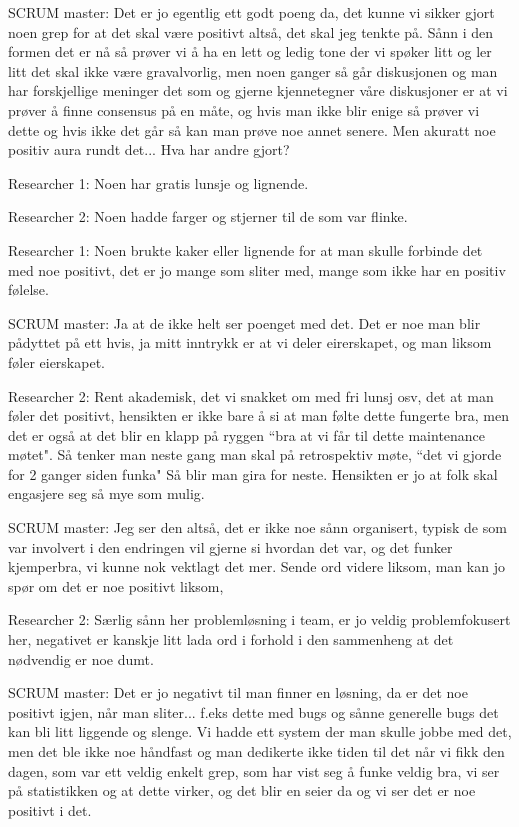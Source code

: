 SCRUM master: Det er jo egentlig ett godt poeng da, det kunne vi sikker gjort noen grep for at det skal være positivt altså, det skal jeg tenkte på. Sånn i den formen det er nå så prøver vi å ha en lett og ledig tone der vi spøker litt og ler litt det skal ikke være gravalvorlig, men noen ganger  så går diskusjonen og man har forskjellige meninger det som og gjerne kjennetegner våre diskusjoner er at vi prøver å finne consensus på en måte, og hvis man ikke blir enige så prøver vi dette og hvis ikke det går så kan man prøve noe annet senere. Men akuratt noe positiv aura rundt det... Hva har andre gjort?

Researcher 1: Noen har gratis lunsje og lignende.

Researcher 2: Noen hadde farger og stjerner til de som var flinke.

Researcher 1: Noen brukte kaker eller lignende for at man skulle forbinde det med noe positivt, det er jo mange som sliter med, mange som ikke har en positiv følelse.

SCRUM master: Ja at de ikke helt ser poenget med det. Det er noe man blir pådyttet på ett hvis, ja mitt inntrykk er at vi deler eirerskapet, og man liksom føler eierskapet.

Researcher 2: Rent akademisk, det vi snakket om med fri lunsj osv, det at man føler det positivt, hensikten er ikke bare å si at man følte dette fungerte bra, men det er også at det blir en klapp på ryggen ``bra at vi får til dette maintenance møtet". Så tenker man neste gang man skal på retrospektiv møte, ``det vi gjorde for 2 ganger siden funka" Så blir man gira for neste. Hensikten er jo  at folk skal engasjere seg så mye som mulig.

SCRUM master: Jeg ser den altså, det er ikke noe sånn organisert, typisk de som var involvert i den endringen vil gjerne si hvordan det var, og det funker kjemperbra, vi kunne nok vektlagt det mer. Sende ord videre liksom, man kan jo spør om det er noe positivt liksom,

Researcher 2: Særlig sånn her problemløsning i team, er jo veldig problemfokusert her, negativet  er kanskje litt lada ord i forhold i den sammenheng at det nødvendig er noe dumt.

SCRUM master: Det er jo negativt til man finner en løsning, da er det noe positivt igjen, når man sliter... f.eks dette med bugs og sånne generelle bugs det kan bli litt liggende og slenge. Vi hadde ett system der man skulle jobbe med det, men det ble ikke noe håndfast og man dedikerte ikke tiden til det når vi fikk den dagen, som var ett veldig enkelt grep, som har vist seg å funke veldig bra, vi ser på statistikken og at dette virker, og det blir en seier da og vi ser det er noe positivt i det. 

